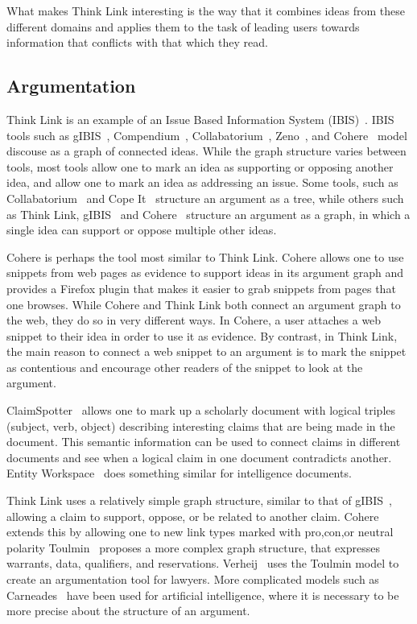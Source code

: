 \documentclass{chi2009}
\begin{document}
What makes Think Link interesting is the way that it combines ideas from these different domains and applies them to the task of leading users towards information that conflicts with that which they read.

\subsection{Argumentation}

Think Link is an example of an Issue Based Information System (IBIS)~\cite{Rittel1973}. IBIS tools such as gIBIS~\cite{Conklin1987a}, Compendium~\cite{Selvin2001}, Collabatorium~\cite{Klein2007}, Zeno~\cite{Gordon1996}, and Cohere~\cite{Shum2008} model discouse as a graph of connected ideas. While the graph structure varies between tools, most tools allow one to mark an idea as supporting or opposing another idea, and allow one to mark an idea as addressing an issue. Some tools, such as Collabatorium~\cite{Klein2007} and Cope It~\cite{Karacapilidis2001} structure an argument as a tree, while others such as Think Link, gIBIS~\cite{Conklin1987a} and Cohere~\cite{Shum2008} structure an argument as a graph, in which a single idea can support or oppose multiple other ideas.

Cohere is perhaps the tool most similar to Think Link. Cohere allows one to use snippets from web pages as evidence to support ideas in its argument graph and provides a Firefox plugin that makes it easier to grab snippets from pages that one browses. While Cohere and Think Link both connect an argument graph to the web, they do so in very different ways. In Cohere, a user attaches a web snippet to their idea in order to use it as evidence. By contrast, in Think Link, the main reason to connect a web snippet to an argument is to mark the snippet as contentious and encourage other readers of the snippet to look at the argument. 

ClaimSpotter~\cite{Sereno2005,Sereno2004} allows one to mark up a scholarly document with logical triples (subject, verb, object) describing interesting claims that are being made in the document. This semantic information can be used to connect claims in different documents and see when a logical claim in one document contradicts another. Entity Workspace~\cite{Bier2006} does something similar for intelligence documents.  

Think Link uses a relatively simple graph structure, similar to that of gIBIS~\cite{Conklin1987a}, allowing a claim to support, oppose, or be related to another claim. Cohere~\cite{Shum2008} extends this by allowing one to new link types marked with pro,con,or neutral polarity Toulmin~\cite{toulmin1958} proposes a more complex graph structure, that expresses warrants, data, qualifiers, and reservations. Verheij~\cite{Verheij1999} uses the Toulmin model to create an argumentation tool for lawyers. More complicated models such as Carneades~\cite{Gordon2007} have been used for artificial intelligence, where it is necessary to be more precise about the structure of an argument.
\end{document}
